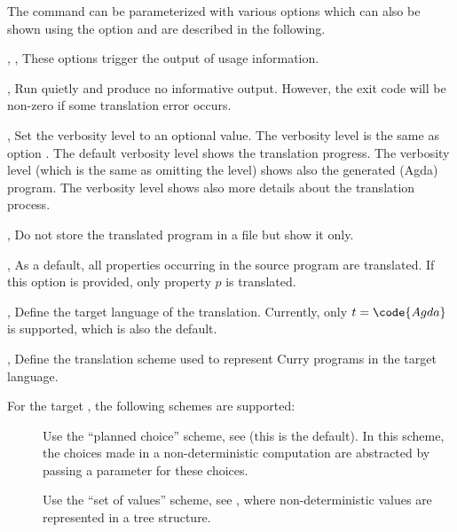 The command  can be parameterized
with various options which can also be shown using the option
 and are described in the following.

\begin{description}
\item{, , }
These options trigger the output of usage information.

\item{, }
Run quietly and produce no informative output.
However, the exit code will be non-zero if some translation error occurs.

\item{, }
Set the verbosity level to an optional value.
The verbosity level  is the same as option .
The default verbosity level  shows the translation progress.
The verbosity level  (which is the same as omitting the level)
shows also the generated (Agda) program.
The verbosity level  shows also more details about
the translation process.

\item{, }
Do not store the translated program in a file but show it only.

\item{, }
As a default, all properties occurring in the source program are
translated. If this option is provided, only property $p$ is translated.

\item{, }
Define the target language of the translation.
Currently, only $t = \code{Agda}$ is supported, which is also the
default.

\item{, }
Define the translation scheme used to represent Curry programs
in the target language.

For the target , the following schemes are supported:
\begin{description}
\item[]
Use the ``planned choice'' scheme, see \cite{AntoyHanusLibby16}
(this is the default).
In this scheme, the choices made in a non-deterministic computation
are abstracted by passing a parameter for these choices.
\item[]
Use the ``set of values'' scheme, see \cite{AntoyHanusLibby16},
where non-deterministic values are represented in a tree structure.
\end{description}

\end{description}

